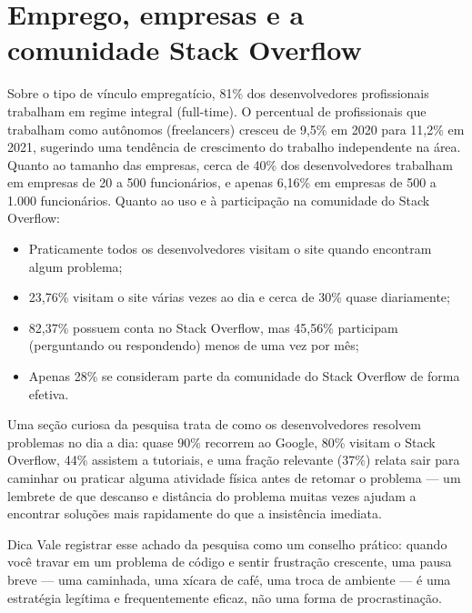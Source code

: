 \section{Emprego, empresas e a comunidade Stack Overflow}

Sobre o tipo de vínculo empregatício, 81\% dos desenvolvedores profissionais trabalham em regime integral (full-time). O percentual de profissionais que trabalham como autônomos (freelancers) cresceu de 9,5\% em 2020 para 11,2\% em 2021, sugerindo uma tendência de crescimento do trabalho independente na área. Quanto ao tamanho das empresas, cerca de 40\% dos desenvolvedores trabalham em empresas de 20 a 500 funcionários, e apenas 6,16\% em empresas de 500 a 1.000 funcionários. Quanto ao uso e à participação na comunidade do Stack Overflow:

\begin{itemize}
  \item Praticamente todos os desenvolvedores visitam o site quando encontram algum problema;
\end{itemize}

\begin{itemize}
  \item 23,76\% visitam o site várias vezes ao dia e cerca de 30\% quase diariamente;
\end{itemize}

\begin{itemize}
  \item 82,37\% possuem conta no Stack Overflow, mas 45,56\% participam (perguntando ou respondendo) menos de uma vez por mês;
\end{itemize}

\begin{itemize}
  \item Apenas 28\% se consideram parte da comunidade do Stack Overflow de forma efetiva.
\end{itemize}

Uma seção curiosa da pesquisa trata de como os desenvolvedores resolvem problemas no dia a dia: quase 90\% recorrem ao Google, 80\% visitam o Stack Overflow, 44\% assistem a tutoriais, e uma fração relevante (37\%) relata sair para caminhar ou praticar alguma atividade física antes de retomar o problema — um lembrete de que descanso e distância do problema muitas vezes ajudam a encontrar soluções mais rapidamente do que a insistência imediata.

\begin{infobox}{Dica}
Vale registrar esse achado da pesquisa como um conselho prático: quando você travar em um problema de código e sentir frustração crescente, uma pausa breve — uma caminhada, uma xícara de café, uma troca de ambiente — é uma estratégia legítima e frequentemente eficaz, não uma forma de procrastinação.
\end{infobox}

